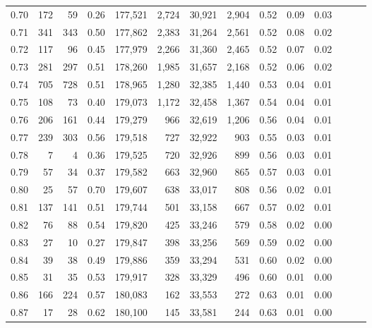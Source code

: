 \begin{tabular}{rrrrrrrrrrrrrr}
0.70 &     172 &     59 &  0.26 &  177,521 &    2,724 &  30,921 &   2,904 &  0.52 &  0.09 &      0.03 \\
0.71 &     341 &    343 &  0.50 &  177,862 &    2,383 &  31,264 &   2,561 &  0.52 &  0.08 &      0.02 \\
0.72 &     117 &     96 &  0.45 &  177,979 &    2,266 &  31,360 &   2,465 &  0.52 &  0.07 &      0.02 \\
0.73 &     281 &    297 &  0.51 &  178,260 &    1,985 &  31,657 &   2,168 &  0.52 &  0.06 &      0.02 \\
0.74 &     705 &    728 &  0.51 &  178,965 &    1,280 &  32,385 &   1,440 &  0.53 &  0.04 &      0.01 \\
0.75 &     108 &     73 &  0.40 &  179,073 &    1,172 &  32,458 &   1,367 &  0.54 &  0.04 &      0.01 \\
0.76 &     206 &    161 &  0.44 &  179,279 &      966 &  32,619 &   1,206 &  0.56 &  0.04 &      0.01 \\
0.77 &     239 &    303 &  0.56 &  179,518 &      727 &  32,922 &     903 &  0.55 &  0.03 &      0.01 \\
0.78 &       7 &      4 &  0.36 &  179,525 &      720 &  32,926 &     899 &  0.56 &  0.03 &      0.01 \\
0.79 &      57 &     34 &  0.37 &  179,582 &      663 &  32,960 &     865 &  0.57 &  0.03 &      0.01 \\
0.80 &      25 &     57 &  0.70 &  179,607 &      638 &  33,017 &     808 &  0.56 &  0.02 &      0.01 \\
0.81 &     137 &    141 &  0.51 &  179,744 &      501 &  33,158 &     667 &  0.57 &  0.02 &      0.01 \\
0.82 &      76 &     88 &  0.54 &  179,820 &      425 &  33,246 &     579 &  0.58 &  0.02 &      0.00 \\
0.83 &      27 &     10 &  0.27 &  179,847 &      398 &  33,256 &     569 &  0.59 &  0.02 &      0.00 \\
0.84 &      39 &     38 &  0.49 &  179,886 &      359 &  33,294 &     531 &  0.60 &  0.02 &      0.00 \\
0.85 &      31 &     35 &  0.53 &  179,917 &      328 &  33,329 &     496 &  0.60 &  0.01 &      0.00 \\
0.86 &     166 &    224 &  0.57 &  180,083 &      162 &  33,553 &     272 &  0.63 &  0.01 &      0.00 \\
0.87 &      17 &     28 &  0.62 &  180,100 &      145 &  33,581 &     244 &  0.63 &  0.01 &      0.00 \\

\end{tabular}
